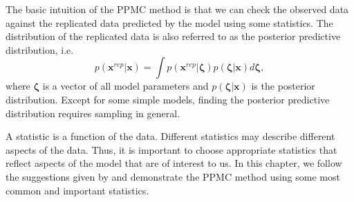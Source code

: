 \documentclass[floatsintext, man]{apa7}
\begin{document}
The basic intuition of the PPMC method is that we can check the observed data
against the replicated data predicted by the model
using some statistics. The distribution of the replicated data is also referred
to as the posterior predictive distribution, i.e.
\begin{equation}
  p(\bm{x}^{rep}|\bm{x}) = \int p(\bm{x}^{rep}|\bm{\zeta})p(\bm{\zeta}|
  \bm{x})d\bm{\zeta},
\end{equation}
where $\bm{\zeta}$ is a vector of all model parameters and $p(\bm{\zeta}|
\bm{x})$ is the posterior distribution. Except for some simple models, finding
the posterior predictive distribution requires sampling in general.

A statistic is a function of the data. Different statistics may describe
different aspects of the data. Thus, it is important to choose
appropriate statistics that reflect aspects of the model that are of interest to
us. In this chapter, we follow the suggestions given by \textcite{sinharay_assessing_2005}
and demonstrate the PPMC method using some most common and important statistics.
\end{document}
